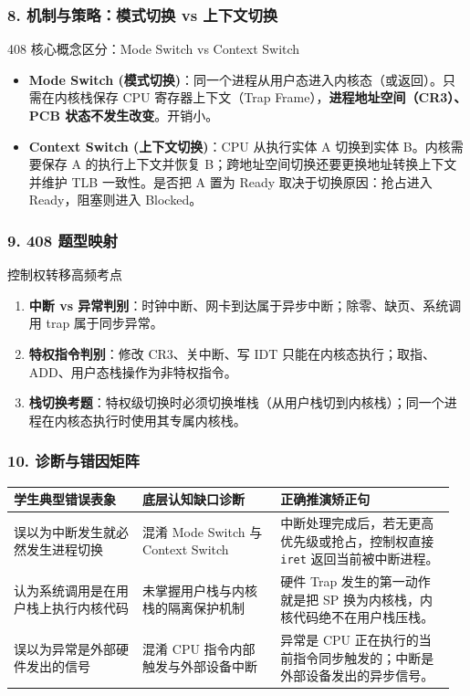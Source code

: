 \documentclass[11pt,a4paper,openany]{ctexbook}
\newcommand{\key}[1]{\textbf{\color{deep}#1}}
\begin{document}
\subsubsection*{8. 机制与策略：模式切换 vs 上下文切换}
\begin{methodbox}{408 核心概念区分：Mode Switch vs Context Switch}
\begin{itemize}
  \item \key{Mode Switch (模式切换)}：同一个进程从用户态进入内核态（或返回）。只需在内核栈保存 CPU 寄存器上下文（Trap Frame），\textbf{进程地址空间（CR3）、PCB 状态不发生改变}。开销小。
  \item \key{Context Switch (上下文切换)}：CPU 从执行实体 A 切换到实体 B。内核需要保存 A 的执行上下文并恢复 B；跨地址空间切换还要更换地址转换上下文并维护 TLB 一致性。是否把 A 置为 Ready 取决于切换原因：抢占进入 Ready，阻塞则进入 Blocked。
\end{itemize}
\end{methodbox}

\subsubsection*{9. 408 题型映射}
\begin{examBox}{控制权转移高频考点}
\begin{enumerate}
  \item \textbf{中断 vs 异常判别}：时钟中断、网卡到达属于异步中断；除零、缺页、系统调用 trap 属于同步异常。
  \item \textbf{特权指令判别}：修改 CR3、关中断、写 IDT 只能在内核态执行；取指、ADD、用户态栈操作为非特权指令。
  \item \textbf{栈切换考题}：特权级切换时必须切换堆栈（从用户栈切到内核栈）；同一个进程在内核态执行时使用其专属内核栈。
\end{enumerate}
\end{examBox}

\subsubsection*{10. 诊断与错因矩阵}
\begingroup
\small
\setlength{\tabcolsep}{3pt}
\begin{longtable}{p{0.28\linewidth}p{0.30\linewidth}p{0.38\linewidth}}
\toprule
\textbf{学生典型错误表象} & \textbf{底层认知缺口诊断} & \textbf{正确推演矫正句} \\
\midrule
误以为中断发生就必然发生进程切换 & 混淆 Mode Switch 与 Context Switch & 中断处理完成后，若无更高优先级或抢占，控制权直接 \texttt{iret} 返回当前被中断进程。 \\
\midrule
认为系统调用是在用户栈上执行内核代码 & 未掌握用户栈与内核栈的隔离保护机制 & 硬件 Trap 发生的第一动作就是把 SP 换为内核栈，内核代码绝不在用户栈压栈。 \\
\midrule
误以为异常是外部硬件发出的信号 & 混淆 CPU 指令内部触发与外部设备中断 & 异常是 CPU 正在执行的当前指令同步触发的；中断是外部设备发出的异步信号。 \\
\bottomrule
\end{longtable}
\endgroup
\end{document}
